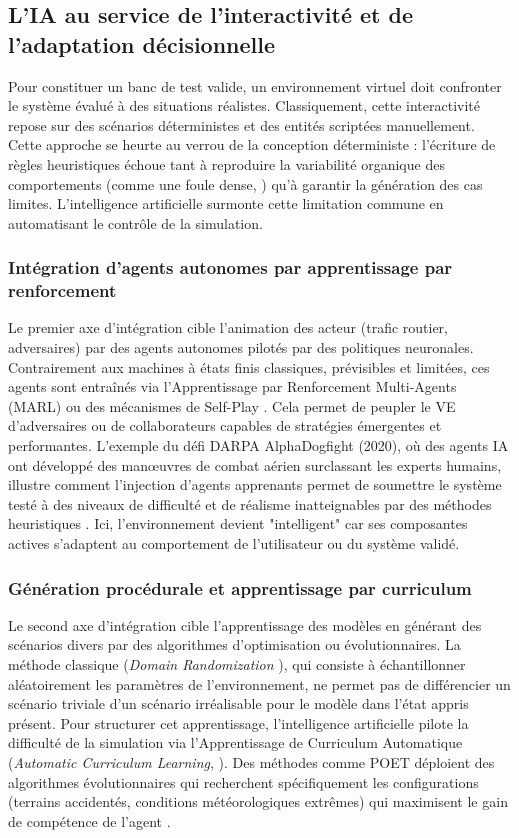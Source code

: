 \subsection{L'IA au service de l'interactivité et de l'adaptation décisionnelle}
Pour constituer un banc de test valide, un environnement virtuel doit confronter le système évalué à des situations réalistes. Classiquement, cette interactivité repose sur des scénarios déterministes et des entités scriptées manuellement. Cette approche se heurte au verrou de la conception déterministe : l'écriture de règles heuristiques échoue tant à reproduire la variabilité organique des comportements (comme une foule dense, \cite{alahi_social_2016}) qu'à garantir la génération des cas limites. L'intelligence artificielle surmonte cette limitation commune en automatisant le contrôle de la simulation.


\subsubsection{Intégration d'agents autonomes par apprentissage par renforcement} 
Le premier axe d'intégration cible l'animation des acteur (trafic routier, adversaires) par des agents autonomes pilotés par des politiques neuronales. Contrairement aux machines à états finis classiques, prévisibles et limitées, ces agents sont entraînés via l'Apprentissage par Renforcement Multi-Agents (MARL) ou des mécanismes de Self-Play \cite{silver_mastering_2017}. Cela permet de peupler le VE d'adversaires ou de collaborateurs capables de stratégies émergentes et performantes. L'exemple du défi DARPA AlphaDogfight (2020), où des agents IA ont développé des manœuvres de combat aérien surclassant les experts humains, illustre comment l'injection d'agents apprenants permet de soumettre le système testé à des niveaux de difficulté et de réalisme inatteignables par des méthodes heuristiques \cite{demay_alphadogfight_2022}. Ici, l'environnement devient "intelligent" car ses composantes actives s'adaptent au comportement de l'utilisateur ou du système validé.

\subsubsection{Génération procédurale et apprentissage par curriculum} 
Le second axe d'intégration cible l'apprentissage des modèles en générant des scénarios divers par des algorithmes d'optimisation ou évolutionnaires. La méthode classique (\textit{Domain Randomization} \cite{tobin_domain_2017}),  qui consiste à échantillonner aléatoirement les paramètres de l'environnement, ne permet pas de différencier un scénario triviale d'un scénario irréalisable pour le modèle dans l'état appris présent. Pour structurer cet apprentissage, l'intelligence artificielle pilote la difficulté de la simulation via l'Apprentissage de Curriculum Automatique (\textit{Automatic Curriculum Learning}, \cite{graves_automated_2017}). Des méthodes comme POET déploient des algorithmes évolutionnaires qui recherchent spécifiquement les configurations (terrains accidentés, conditions météorologiques extrêmes) qui maximisent le gain de compétence de l'agent \cite{wang_paired_2019}.\\

